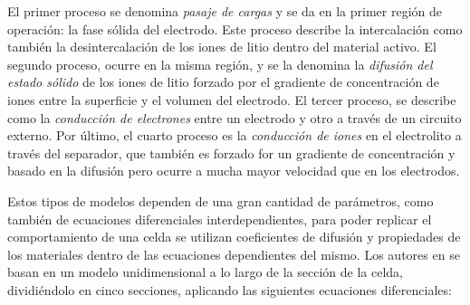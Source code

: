 \documentclass[10pt,a4paper]{article}
\begin{document}
\noindent El primer proceso se denomina \emph{pasaje de cargas} y se da en 
la primer regi\'on de operaci\'on: la fase s\'olida del electrodo. 
Este proceso describe la intercalaci\'on como tambi\'en la desintercalaci\'on 
de los iones de litio dentro del material activo. El segundo proceso, ocurre 
en la misma regi\'on, y se la denomina la \emph{difusi\'on del estado s\'olido} 
de los iones de litio forzado por el gradiente de concentraci\'on de iones entre 
la superficie y el volumen del electrodo. El tercer proceso, se describe como 
la \emph{conducci\'on de electrones} entre un electrodo y otro a trav\'es de 
un circuito externo. Por \'ultimo, el cuarto proceso es la \emph{conducci\'on de 
iones} en el electrolito a trav\'es del separador, que tambi\'en es forzado for 
un gradiente de concentraci\'on y basado en la difusi\'on pero ocurre a mucha 
mayor velocidad que en los electrodos.

\noindent Estos tipos de modelos dependen de una gran cantidad de par\'ametros,
como tambi\'en de ecuaciones diferenciales interdependientes, para poder 
replicar el comportamiento de una celda se utilizan coeficientes de difusi\'on y 
propiedades de los materiales dentro de las ecuaciones dependientes del mismo. 
Los autores en \cite{Li2016} se basan en un modelo unidimensional a lo largo de 
la secci\'on de la celda, dividiéndolo en cinco secciones, aplicando las 
siguientes ecuaciones diferenciales: 
\end{document}
